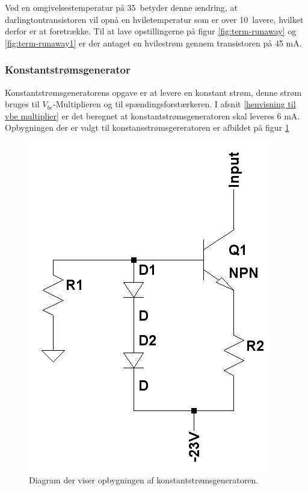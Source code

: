 Ved en omgivelsestemperatur på 35~\celsius betyder denne ændring, at darlingtontransistoren vil opnå en hviletemperatur som er over 10~\celsius lavere, hvilket derfor er at foretrække. Til at lave opstillingerne på figur \ref{fig:term-runaway} og \ref{fig:term-runaway1} er der antaget en hvilestrøm gennem transistoren på 45 mA.


\subsubsection*{Konstantstrømsgenerator}
Konstantstrømsgeneratorens opgave er at levere en konstant strøm, denne strøm bruges til $V_{be}$-Multiplieren og til spændingsforstærkeren. I afsnit \ref{henvisning til vbe multiplier} er det beregnet at konstantstrømsgeneratoren skal leveres 6 mA. Opbygningen der er valgt til konstansstrømsgereratoren er afbildet på figur \ref{konstantstroemsgenerator_model}

\begin{figure}[h]
\centering
\includegraphics[scale=0.35]{teknisk/effektforstaerker/stoemgenerator.png}
\caption{Diagram der viser opbygningen af konstantstrømsgeneratoren.}
\label{konstantstroemsgenerator_model}
\end{figure}

